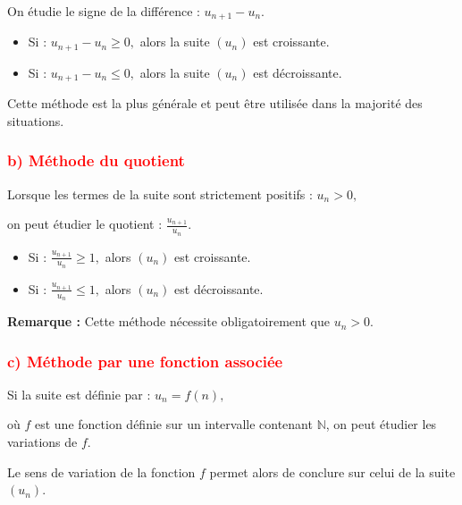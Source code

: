 \documentclass[12pt,a4paper]{article}
\begin{document}
On étudie le signe de la différence :
\(
u_{n+1}-u_n.
\)

\begin{itemize}
	\item Si :
	\(
	u_{n+1}-u_n\geq0,
	\)
	alors la suite $\left(u_n\right)$ est croissante.
	
	\item Si :
	\(
	u_{n+1}-u_n\leq0,
	\)
	alors la suite $\left(u_n\right)$ est décroissante.
\end{itemize}

\medskip

Cette méthode est la plus générale et peut être utilisée dans la majorité
des situations.


\subsubsection*{\textcolor{red}{b) Méthode du quotient}}

Lorsque les termes de la suite sont strictement positifs :
\(
u_n>0,
\)

on peut étudier le quotient :
\(
\frac{u_{n+1}}{u_n}.
\)

\begin{itemize}
	\item Si :
	\(
	\frac{u_{n+1}}{u_n}\geq1,
	\)
	alors $\left(u_n\right)$ est croissante.
	
	\item Si :
	\(
	\frac{u_{n+1}}{u_n}\leq1,
	\)
	alors $\left(u_n\right)$ est décroissante.
\end{itemize}

\textbf{Remarque :} Cette méthode nécessite obligatoirement que
$u_n>0$.


\subsubsection*{\textcolor{red}{c) Méthode par une fonction associée}}

Si la suite est définie par :
\(
u_n=f(n),
\)

où $f$ est une fonction définie sur un intervalle contenant $\mathbb{N}$,
on peut étudier les variations de $f$.

\medskip

Le sens de variation de la fonction $f$ permet alors de conclure sur
celui de la suite $\left(u_n\right)$.
\end{document}
